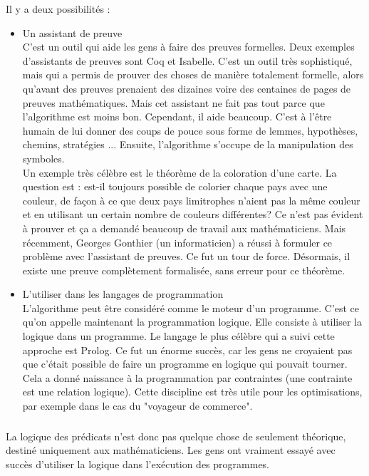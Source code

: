 Il y a deux possibilités : 
\begin{itemize}
\item Un assistant de preuve\\
C'est un outil qui aide les gens à faire des preuves formelles. Deux exemples d'assistants de preuves sont Coq et Isabelle. C'est un outil très sophistiqué, mais qui a permis de prouver des choses de manière totalement formelle, alors qu'avant des preuves prenaient des dizaines voire des centaines de pages de preuves mathématiques. Mais cet assistant ne fait pas tout parce que l'algorithme est moins bon. Cependant, il aide beaucoup. C'est à l'être humain de lui donner des coups de pouce sous forme de lemmes, hypothèses, chemins, stratégies ... Ensuite, l'algorithme s'occupe de la manipulation des symboles.\\
Un exemple très célèbre est le théorème de la coloration d'une carte. La question est : est-il toujours possible de colorier chaque pays avec une couleur, de façon à ce que deux pays limitrophes n'aient pas la même couleur et en utilisant un certain nombre de couleurs différentes? Ce n'est pas évident à prouver et ça a demandé beaucoup de travail aux mathématiciens. Mais récemment, Georges Gonthier (un informaticien) a réussi à formuler ce problème avec l'assistant de preuves. Ce fut un tour de force. Désormais, il existe une preuve complètement formalisée, sans erreur pour ce théorème.
\item L'utiliser dans les langages de programmation\\
L'algorithme peut être considéré comme le moteur d'un programme. C'est ce qu'on appelle maintenant la programmation logique. Elle consiste à utiliser la logique dans un programme. Le langage le plus célèbre qui a suivi cette approche est Prolog. Ce fut un énorme succès, car les gens ne croyaient pas que c'était possible de faire un programme en logique qui pouvait tourner. Cela a donné naissance à la programmation par contraintes (une contrainte est une relation logique). Cette discipline est très utile pour les optimisations, par exemple dans le cas du "voyageur de commerce".
\end{itemize}
\subsubsection{}
La logique des prédicats n'est donc pas quelque chose de seulement théorique, destiné uniquement aux mathématiciens. Les gens ont vraiment essayé avec succès d'utiliser la logique dans l'exécution des programmes.
